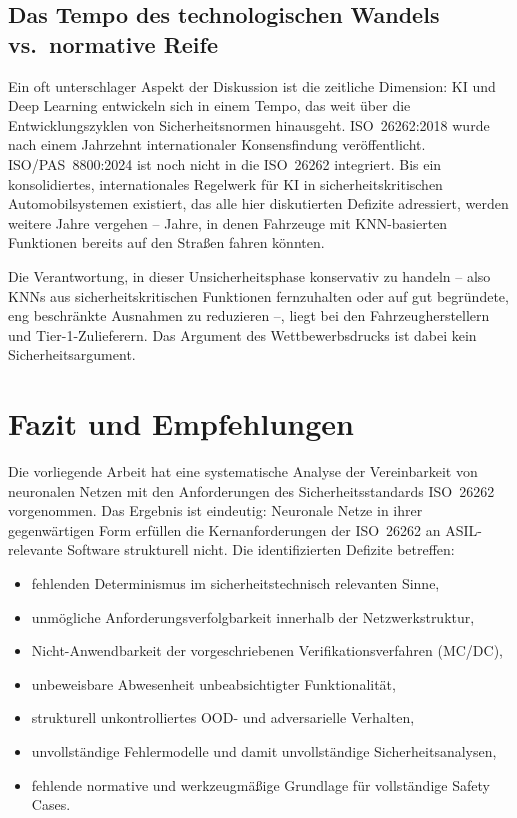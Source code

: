 ﻿\documentclass[12pt,a4paper]{article}
\begin{document}
\subsection{Das Tempo des technologischen Wandels vs.\ normative Reife}
\label{subsec:tempo}

Ein oft unterschlager Aspekt der Diskussion ist die zeitliche Dimension: KI und
Deep Learning entwickeln sich in einem Tempo, das weit \"uber die Entwicklungszyklen
von Sicherheitsnormen hinausgeht. ISO~26262:2018 wurde nach einem Jahrzehnt
internationaler Konsensfindung ver\"offentlicht. ISO/PAS~8800:2024 ist noch nicht
in die ISO~26262 integriert. Bis ein konsolidiertes, internationales Regelwerk
f\"ur KI in sicherheitskritischen Automobil\-systemen existiert, das alle hier
diskutierten Defizite adressiert, werden weitere Jahre vergehen -- Jahre, in denen
Fahrzeuge mit KNN-basierten Funktionen bereits auf den Stra\ss{}en fahren k\"onnten.

Die Verantwortung, in dieser Unsicherheitsphase konservativ zu handeln -- also
KNNs aus sicherheitskritischen Funktionen fernzuhalten oder auf gut begr\"undete,
eng beschr\"ankte Ausnahmen zu reduzieren --, liegt bei den Fahrzeugherstellern
und Tier-1-Zulieferern. Das Argument des Wettbewerbsdrucks ist dabei kein
Sicherheitsargument.

\section{Fazit und Empfehlungen}
\label{sec:fazit}

Die vorliegende Arbeit hat eine systematische Analyse der Vereinbarkeit von
neuronalen Netzen mit den Anforderungen des Sicherheitsstandards ISO~26262
vorgenommen. Das Ergebnis ist eindeutig: Neuronale Netze in ihrer gegenw\"artigen
Form erf\"ullen die Kernanforderungen der ISO~26262 an ASIL-relevante Software
strukturell nicht. Die identifizierten Defizite betreffen:

\begin{itemize}[itemsep=2pt]
  \item fehlenden Determinismus im sicherheitstechnisch relevanten Sinne,
  \item unm\"ogliche Anforderungsverfolgbarkeit innerhalb der Netzwerkstruktur,
  \item Nicht-Anwendbarkeit der vorgeschriebenen Verifikationsverfahren (MC/DC),
  \item unbeweisbare Abwesenheit unbeabsichtigter Funktionalit\"at,
  \item strukturell unkontrolliertes OOD- und adversarielle Verhalten,
  \item unvollst\"andige Fehlermodelle und damit unvollst\"andige Sicherheitsanalysen,
  \item fehlende normative und werkzeugm\"a\ss{}ige Grundlage f\"ur vollst\"andige
    Safety Cases.
\end{itemize}
\end{document}
